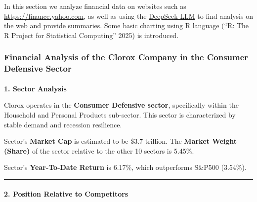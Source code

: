\documentclass[
  letterpaper,
  DIV=11,
  numbers=noendperiod]{scrartcl}
\makeatletter
\let\oldparagraph\paragraph
\renewcommand{\paragraph}{
    \@ifstar
      \xxxParagraphStar
      \xxxParagraphNoStar
  }
\newcommand{\xxxParagraphStar}[1]{\oldparagraph*{#1}\mbox{}}
\newcommand{\xxxParagraphNoStar}[1]{\oldparagraph{#1}\mbox{}}
\makeatother
\begin{document}
\begin{tcolorbox}[enhanced jigsaw, left=2mm, colback=white, opacityback=0, coltitle=black, arc=.35mm, leftrule=.75mm, bottomrule=.15mm, colbacktitle=quarto-callout-note-color!10!white, toptitle=1mm, title=\textcolor{quarto-callout-note-color}{\faInfo}\hspace{0.5em}{Note}, opacitybacktitle=0.6, bottomtitle=1mm, titlerule=0mm, breakable, rightrule=.15mm, toprule=.15mm, colframe=quarto-callout-note-color-frame]

In this section we analyze financial data on websites such as
\url{https://finance.yahoo.com}, as well as using the
\href{https://chat.deepseek.com/}{DeepSeek LLM} to find analysis on the
web and provide summaries. Some basic charting using R language ({``R:
{The R Project} for {Statistical Computing}''} 2025) is introduced.

\end{tcolorbox}

\subsubsection{Financial Analysis of the Clorox Company in the Consumer
Defensive
Sector}\label{financial-analysis-of-the-clorox-company-in-the-consumer-defensive-sector}

\paragraph{\texorpdfstring{\textbf{1. Sector
Analysis}}{1. Sector Analysis}}\label{sector-analysis-1}

Clorox operates in the \textbf{Consumer Defensive sector}, specifically
within the Household and Personal Products sub-sector. This sector is
characterized by stable demand and recession resilience.

Sector's \textbf{Market Cap} is estimated to be \$3.7 trillion. The
\textbf{Market Weight (Share)} of the sector relative to the other 10
sectors is 5.45\%.

Sector's \textbf{Year-To-Date Return} is 6.17\%, which outperforms
S\&P500 (3.54\%).

\begin{center}\rule{0.5\linewidth}{0.5pt}\end{center}

\paragraph{\texorpdfstring{\textbf{2. Position Relative to
Competitors}}{2. Position Relative to Competitors}}\label{position-relative-to-competitors}
\end{document}
